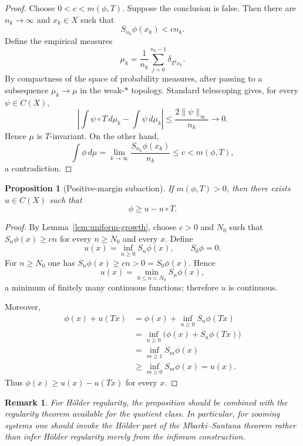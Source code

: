 \documentclass[11pt,a4paper]{article}
\newtheorem{proposition}[theorem]{Proposition}
\newtheorem{remark}[theorem]{Remark}
\begin{document}
\begin{proof}
Choose $0<c<m(\phi,T)$. Suppose the conclusion is false. Then there are
$n_k\to\infty$ and $x_k\in X$ such that
\[
S_{n_k}\phi(x_k)<cn_k.
\]
Define the empirical measures
\[
\mu_k
=
\frac1{n_k}
\sum_{j=0}^{n_k-1}\delta_{T^jx_k}.
\]
By compactness of the space of probability measures, after passing to a
subsequence $\mu_k\to\mu$ in the weak-$*$ topology. Standard telescoping
gives, for every $\psi\in C(X)$,
\[
\left|
\int\psi\circ T\,d\mu_k-\int\psi\,d\mu_k
\right|
\leq
\frac{2\|\psi\|_\infty}{n_k}\to0.
\]
Hence $\mu$ is $T$-invariant. On the other hand,
\[
\int\phi\,d\mu
=
\lim_{k\to\infty}
\frac{S_{n_k}\phi(x_k)}{n_k}
\leq c<m(\phi,T),
\]
a contradiction.
\end{proof}

\begin{proposition}[Positive-margin subaction]
\label{prop:positive}
If $m(\phi,T)>0$, then there exists $u\in C(X)$ such that
\[
\phi\geq u-u\circ T.
\]
\end{proposition}

\begin{proof}
By Lemma~\ref{lem:uniform-growth}, choose $c>0$ and $N_0$ such that
$S_n\phi(x)\ge cn$ for every $n\ge N_0$ and every $x$. Define
\begin{equation}
 u(x)=\inf_{n\ge0}S_n\phi(x),\qquad S_0\phi=0.
 \label{eq:positive-inf}
\end{equation}
For $n\ge N_0$ one has $S_n\phi(x)\ge cn>0=S_0\phi(x)$. Hence
\[
 u(x)=\min_{0\le n<N_0}S_n\phi(x),
\]
a minimum of finitely many continuous functions; therefore $u$ is
continuous.

Moreover,
\begin{align*}
\phi(x)+u(Tx)
&=\phi(x)+\inf_{n\ge0}S_n\phi(Tx)\\
&=\inf_{n\ge0}\bigl(\phi(x)+S_n\phi(Tx)\bigr)\\
&=\inf_{m\ge1}S_m\phi(x)\\
&\ge \inf_{m\ge0}S_m\phi(x)=u(x).
\end{align*}
Thus $\phi(x)\ge u(x)-u(Tx)$ for every $x$.
\end{proof}

\begin{remark}
For H\"older regularity, the proposition should be combined with the
regularity theorem available for the quotient class. In particular, for
zooming systems one should invoke the H\"older part of the
Mbarki--Santana theorem rather than infer H\"older regularity merely from
the infimum construction.
\end{remark}
\end{document}
